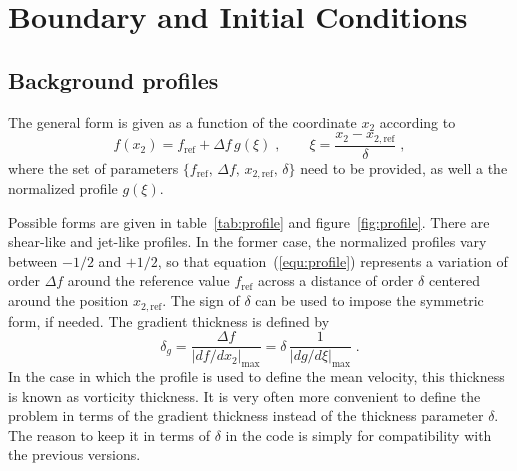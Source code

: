\chapter{Boundary and Initial Conditions}\label{sec:bcs}

\section{Background profiles}

The general form is given as a function of the coordinate $x_2$ according to
\begin{equation}
  f(x_2) = f_\text{ref}+\Delta f\, g(\xi) \;,\qquad
  \xi=\frac{x_2-x_{2,\text{ref}}}{\delta} \;,
\label{equ:profile}
\end{equation}
where the set of parameters $\{f_\text{ref},\,\Delta
f,\,x_{2,\text{ref}},\,\delta\}$ need to be provided, as well a the normalized
profile $g(\xi)$.

Possible forms are given in table~\ref{tab:profile} and
figure~\ref{fig:profile}. There are shear-like and jet-like profiles. In the
former case, the normalized profiles vary between $-1/2$ and $+1/2$, so that
equation~(\ref{equ:profile}) represents a variation of order $\Delta f$ around
the reference value $f_\text{ref}$ across a distance of order $\delta$ centered
around the position $x_{2,\text{ref}}$. The sign of $\delta$ can be used to
impose the symmetric form, if needed. The gradient thickness is defined by
\begin{equation}
  \delta_g =\frac{\Delta f}{|d f/d x_2|_\text{max}} =
  \delta\,\frac{1}{|d g/d \xi|_\text{max}} \;.
\label{equ:deltag}
\end{equation}
In the case in which the profile is used to define the mean velocity, this
thickness is known as vorticity thickness.  It is very often more convenient to
define the problem in terms of the gradient thickness instead of the thickness
parameter $\delta$. The reason to keep it in terms of $\delta$ in the code is
simply for compatibility with the previous versions.

